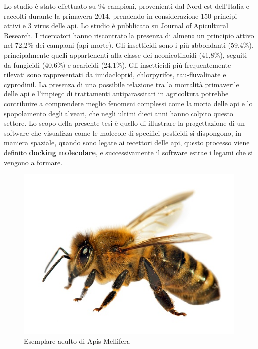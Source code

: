 Lo studio è stato effettuato su 94 campioni, provenienti dal Nord-est dell’Italia e raccolti durante la primavera 2014, prendendo in considerazione 150 principi attivi e 3 virus delle api. Lo studio è pubblicato su Journal of Apicultural Research. I ricercatori hanno riscontrato la presenza di almeno un principio attivo nel 72,2\% dei campioni (api morte). Gli insetticidi sono i più abbondanti (59,4\%), principalmente quelli appartenenti alla classe dei neonicotinoidi (41,8\%), seguiti da fungicidi (40,6\%) e acaricidi (24,1\%). Gli insetticidi più frequentemente rilevati sono rappresentati da imidacloprid, chlorpyrifos, tau-fluvalinate e cyprodinil.\newline
La presenza di una possibile relazione tra la mortalità primaverile delle api e l’impiego di trattamenti antiparassitari in agricoltura potrebbe contribuire a comprendere meglio fenomeni complessi come la moria delle api e lo spopolamento degli alveari, che negli ultimi dieci anni hanno colpito questo settore\cite{martinello2017spring}.\newline
Lo scopo della presente tesi è quello di illustrare la progettazione di un software che visualizza come le molecole di specifici pesticidi si dispongono, in maniera spaziale, quando sono legate ai recettori delle api, questo processo viene definito \textbf{docking molecolare}, e successivamente il software estrae i legami che si vengono a formare.

\begin{figure}[H]
    \centering
    \includegraphics{immagini/apisMellifera.png}
    \caption{Esemplare adulto di Apis Mellifera}
    \label{fig:Apis Mellifera}
\end{figure}

